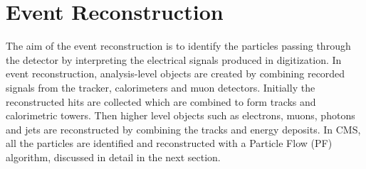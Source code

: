 \section{Event Reconstruction}
The aim of the event reconstruction is to identify the particles passing through the detector by interpreting the electrical signals produced in digitization. In event reconstruction, analysis-level objects are created by combining recorded signals from the tracker, calorimeters and muon detectors. Initially the reconstructed hits are collected which are combined to form tracks and calorimetric towers. Then higher level objects such as electrons, muons, photons and jets are reconstructed by combining the tracks and energy deposits. In CMS, all the particles are identified and reconstructed with a Particle Flow (PF) algorithm, discussed in detail in the next section.


